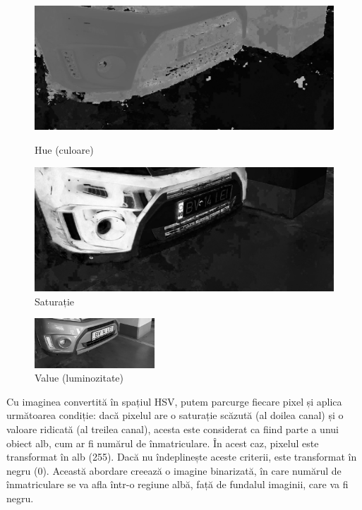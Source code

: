 \documentclass[a4paper,12pt]{report}
\begin{document}
\begin{figure}[h!]
    \centering
    \begin{minipage}{0.4\textwidth}
        \centering
        \includegraphics[width=1\textwidth]{images/hue.jpg}
        \caption{Hue (culoare)}
    \end{minipage}
    \hspace{0.05\textwidth}
    \begin{minipage}{0.4\textwidth}
        \centering
        \includegraphics[width=1\textwidth]{images/saturation.jpg}
        \caption{Saturație}
    \end{minipage}
\end{figure}
\FloatBarrier
\begin{figure}[h!]
    \centering
    \includegraphics[width=0.4\textwidth]{images/value.jpg}
    \caption{Value (luminozitate)}
\end{figure}
\FloatBarrier

Cu imaginea convertită în spațiul HSV, putem parcurge fiecare pixel și aplica următoarea condiție: dacă pixelul are o saturație scăzută (al doilea canal) și o valoare ridicată (al treilea canal), acesta este considerat ca fiind parte a unui obiect alb, cum ar fi numărul de înmatriculare. În acest caz, pixelul este transformat în alb (255). Dacă nu îndeplinește aceste criterii, este transformat în negru (0). Această abordare creează o imagine binarizată, în care numărul de înmatriculare se va afla într-o regiune albă, față de fundalul imaginii, care va fi negru.
\end{document}
